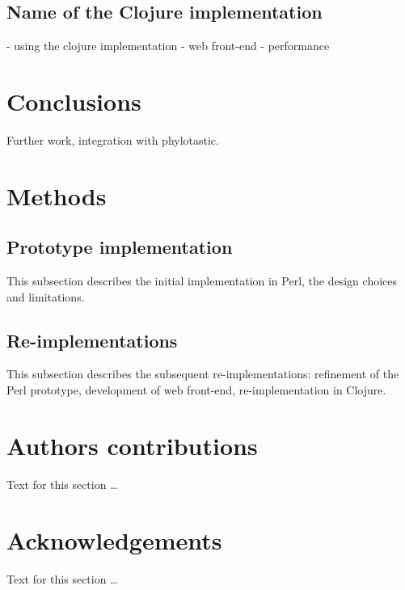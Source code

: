 \documentclass[10pt]{bmc_article}
\newenvironment{bmcformat}{\begin{raggedright}\baselineskip20pt\sloppy\setboolean{publ}{false}}{\end{raggedright}\baselineskip20pt\sloppy}
\begin{document}
\begin{bmcformat}
  \subsection*{Name of the Clojure implementation}
  - using the clojure implementation
  - web front-end
  - performance

\section*{Conclusions}
  Further work, integration with phylotastic.
  
\section*{Methods}

  \subsection*{Prototype implementation}
	This subsection describes the initial implementation in Perl,
	the design choices and limitations.

  \subsection*{Re-implementations}
    This subsection describes the subsequent re-implementations:
    refinement of the Perl prototype, development of web front-end,
    re-implementation in Clojure.
    
\section*{Authors contributions}
    Text for this section \ldots

\section*{Acknowledgements}
  Text for this section \ldots



\end{bmcformat}
\end{document}
